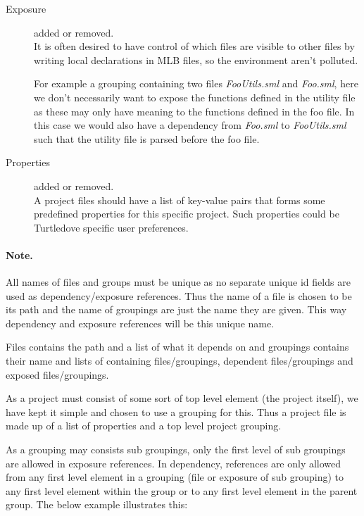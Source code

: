 \begin{description}
\item[Exposure] added or removed. \\

  It is often desired to have control of which files are visible to other files
  by writing local declarations in MLB files, so the environment aren't
  polluted.  

  For example a grouping containing two files \textit{FooUtils.sml} and
  \textit{Foo.sml}, here we don't necessarily want to expose the functions
  defined in the utility file as these may only have meaning to the functions
  defined in the foo file. In this case we would also have a dependency from
  \textit{Foo.sml} to \textit{FooUtils.sml} such that the utility file is parsed
  before the foo file.


\item[Properties] added or removed. \\

  A project files should have a list of key-value pairs that forms some
  predefined properties for this specific project. Such properties could be
  Turtledove specific user preferences.

\end{description}

\paragraph{Note.} All names of files and groups must be unique as no separate
unique id fields are used as dependency/exposure references. Thus the name of a
file is chosen to be its path and the name of groupings are just the name they
are given. This way dependency and exposure references will be this unique name.

Files contains the path and a list of what it depends on and groupings contains
their name and lists of containing files/groupings, dependent files/groupings
and exposed files/groupings.

As a project must consist of some sort of top level element (the project
itself), we have kept it simple and chosen to use a grouping for this. Thus a
project file is made up of a list of properties and a top level project
grouping.

As a grouping may consists sub groupings, only the first level of sub groupings
are allowed in exposure references. In dependency, references are
only allowed from any first level element in a grouping (file or exposure of sub grouping)
to any first level element within the group or to any first level element in the
parent group. The below example illustrates this:

